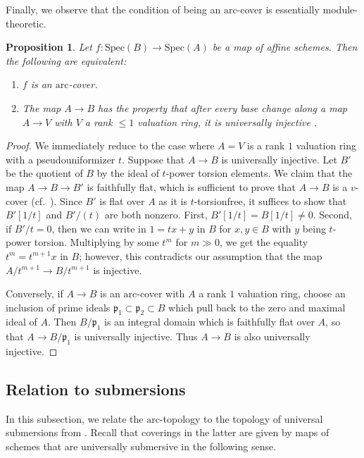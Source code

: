 \documentclass[reqno]{amsart}
\newcommand{\spec}{\mathrm{Spec}}
\newcommand{\arc}{\mathrm{arc}}
\newtheorem{proposition}[theorem]{Proposition}
\theoremstyle{definition}
\begin{document}
Finally, we observe that the condition of being an $\arc$-cover is essentially
module-theoretic. 
\begin{proposition} 
Let $f\colon  \spec(B) \to \spec(A)$ be a map of affine schemes.   Then the following are
equivalent: 
\begin{enumerate}
\item  $f$ is an $\arc$-cover. 
\item The map $A \to B$ has the property that after
every base change along a map $A \to V$ with $V$ a rank $\leq 1$ valuation ring, 
it is universally injective \cite[Tag 058I]{stacks-project}. 
\end{enumerate}
\end{proposition} 
\begin{proof} 
We immediately reduce to the case where $A = V$ is a rank $1$ valuation
ring with a pseudouniformizer $t$. 
Suppose that $A \to B$ is universally injective. Let $B'$ be the quotient of $B$ by the ideal of $t$-power torsion elements.  
We claim that the map $A \to B \to B'$ is faithfully flat, which is
sufficient to prove that $A \to B$ is a $v$-cover (cf.~\cite[Rem.~2.5]{Rydh}). 
Since $B'$ is flat over $A$ as it is $t$-torsionfree, it suffices to show that 
$B'[1/t]$ and $B'/(t)$ are both nonzero. First, $B'[1/t] = B[1/t] \neq 0$. 
Second, if $B'/t = 0$, then we can write in $1 = tx + y$ in $B$ for $x,y \in B$ with $y$ being $t$-power torsion. Multiplying by some $t^m$ for $m
\gg 0$, we get the equality $t^{m} = t^{m+1} x$  in $B$; however, this contradicts 
our assumption that the map  $A/t^{m+1} \to B/t^{m+1}$ is injective. 

Conversely, 
if $A \to B$ is an $\arc$-cover with $A$ a rank $1$ valuation ring, choose an inclusion of prime ideals
$\mathfrak{p}_1 \subset \mathfrak{p}_2 \subset B$ which pull back to the zero
and maximal ideal of $A$. Then $B/\mathfrak{p}_1$ is an integral domain which
is faithfully flat over $A$, so that $A \to B/\mathfrak{p}_1$ is universally
injective. Thus $A \to B$ is also universally injective. 
\end{proof} 
\subsection{Relation to submersions}
\label{SpecSubm}

In this subsection, we relate the $\arc$-topology to the topology of universal
submersions from \cite{Pic,Rydh}. 
Recall that coverings in the latter are given
by maps of schemes that are universally submersive
in the following sense. 
\end{document}
